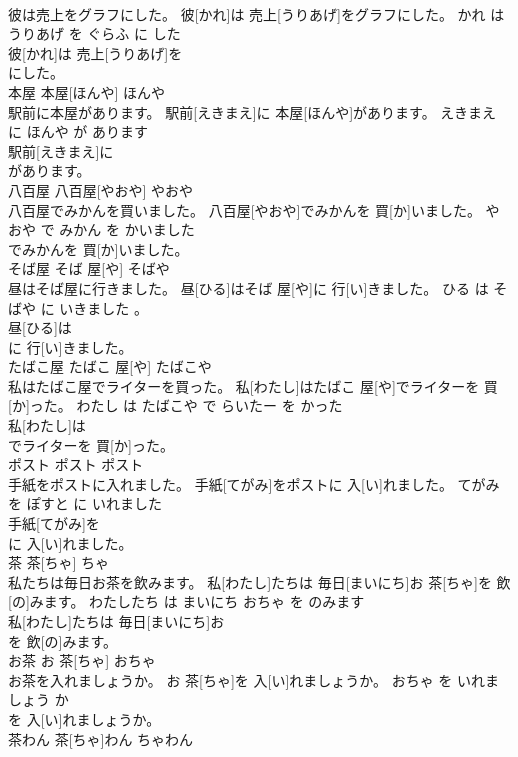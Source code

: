 \documentclass[8pt]{extreport}
\begin{document}
\begin{CJK}{UTF8}{min}
\\	彼は売上をグラフにした。	彼[かれ]は 売上[うりあげ]をグラフにした。	かれ は うりあげ を ぐらふ に した	
\\	彼[かれ]は 売上[うりあげ]を
\\	にした。		
\\	本屋	本屋[ほんや]	ほんや	
\\	駅前に本屋があります。	駅前[えきまえ]に 本屋[ほんや]があります。	えきまえ に ほんや が あります	
\\	駅前[えきまえ]に
\\	があります。		
\\	八百屋	八百屋[やおや]	やおや	
\\	八百屋でみかんを買いました。	八百屋[やおや]でみかんを 買[か]いました。	やおや で みかん を かいました	
\\	でみかんを 買[か]いました。		
\\	そば屋	そば 屋[や]	そばや	
\\	昼はそば屋に行きました。	昼[ひる]はそば 屋[や]に 行[い]きました。	ひる は そばや に いきました 。	
\\	昼[ひる]は
\\	に 行[い]きました。		
\\	たばこ屋	たばこ 屋[や]	たばこや	
\\	私はたばこ屋でライターを買った。	私[わたし]はたばこ 屋[や]でライターを 買[か]った。	わたし は たばこや で らいたー を かった	
\\	私[わたし]は
\\	でライターを 買[か]った。		
\\	ポスト	ポスト	ポスト	
\\	手紙をポストに入れました。	手紙[てがみ]をポストに 入[い]れました。	てがみ を ぽすと に いれました	
\\	手紙[てがみ]を
\\	に 入[い]れました。		
\\	茶	茶[ちゃ]	ちゃ	
\\	私たちは毎日お茶を飲みます。	私[わたし]たちは 毎日[まいにち]お 茶[ちゃ]を 飲[の]みます。	わたしたち は まいにち おちゃ を のみます	
\\	私[わたし]たちは 毎日[まいにち]お
\\	を 飲[の]みます。		
\\	お茶	お 茶[ちゃ]	おちゃ	
\\	お茶を入れましょうか。	お 茶[ちゃ]を 入[い]れましょうか。	おちゃ を いれましょう か	
\\	を 入[い]れましょうか。		
\\	茶わん	茶[ちゃ]わん	ちゃわん	

\end{CJK}
\end{document}
